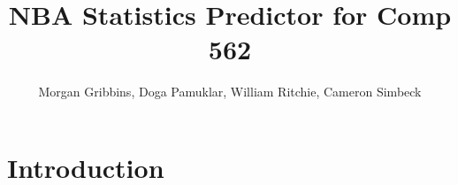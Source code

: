 \documentclass[12pt,letterpaper]{article}
\title{NBA Statistics Predictor for Comp 562}
\author{Morgan Gribbins, Doga Pamuklar, William Ritchie, Cameron Simbeck}
\date{}
\begin{document}
\maketitle{}

\section{Introduction}
\end{document}
